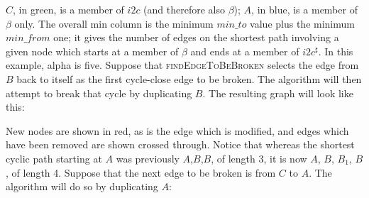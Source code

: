 $C$, in green, is a member of $i2c$ (and therefore also $\beta$); $A$,
in blue, is a member of $\beta$ only.  The overall min column is the
minimum $\mathit{min\_to}$ value plus the minimum $\mathit{min\_from}$
one; it gives the number of edges on the shortest path involving a
given node which starts at a member of $\beta$ and ends at a member of
$i2c^\sharp$.  In this example, \gls{alpha} is five.  Suppose that
\textsc{findEdgeToBeBroken} selects the edge from $B$ back to itself
as the first cycle-close edge to be broken.  The algorithm will then
attempt to break that cycle by duplicating $B$.  The resulting graph
will look like this:


New nodes are shown in red, as is the edge which is modified, and
edges which have been removed are shown crossed through.  Notice that
whereas the shortest cyclic path starting at $A$ was previously
$A$,$B$,$B$, of length 3, it is now $A$, $B$, $B_1$, $B$, of length 4.
Suppose that the next edge to be broken is from $C$ to $A$.  The
algorithm will do so by duplicating $A$:

